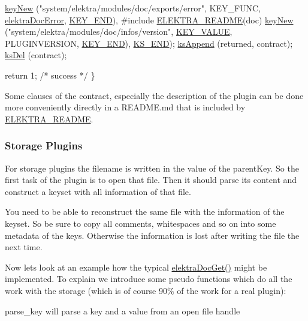 \begin{DoxyCodeInclude}
                \hyperlink{group__key_gad23c65b44bf48d773759e1f9a4d43b89}{keyNew} (\textcolor{stringliteral}{"system/elektra/modules/doc/exports/error"},
                        KEY\_FUNC, \hyperlink{group__plugin_gad74b35f558ac7c3262f6069c5c47dc79}{elektraDocError}, \hyperlink{group__key_gga91fb3178848bd682000958089abbaf40aa8adb6fcb92dec58fb19410eacfdd403}{KEY\_END}),
#include \hyperlink{group__plugin_ga78d616f68bf9fb0942f66478597467c6}{ELEKTRA\_README}(doc)
                \hyperlink{group__key_gad23c65b44bf48d773759e1f9a4d43b89}{keyNew} (\textcolor{stringliteral}{"system/elektra/modules/doc/infos/version"},
                        \hyperlink{group__key_gga91fb3178848bd682000958089abbaf40ac66e4a49d09212b79f5754ca6db5bd2e}{KEY\_VALUE}, PLUGINVERSION, \hyperlink{group__key_gga91fb3178848bd682000958089abbaf40aa8adb6fcb92dec58fb19410eacfdd403}{KEY\_END}),
                \hyperlink{kdbenum_8c_a7a28fce3773b2c873c94ac80b8b4cd54}{KS\_END});
                \hyperlink{group__keyset_ga21eb9c3a14a604ee3a8bdc779232e7b7}{ksAppend} (returned, contract);
                \hyperlink{group__keyset_ga27e5c16473b02a422238c8d970db7ac8}{ksDel} (contract);

                \textcolor{keywordflow}{return} 1; \textcolor{comment}{/* success */}
        \}
\end{DoxyCodeInclude}
 Some clauses of the contract, especially the description of the plugin can be done more conveniently directly in a R\+E\+A\+D\+M\+E.\+md that is included by \hyperlink{group__plugin_ga78d616f68bf9fb0942f66478597467c6}{E\+L\+E\+K\+T\+R\+A\+\_\+\+R\+E\+A\+D\+M\+E}.\hypertarget{group__plugin_storage}{}\subsubsection{Storage Plugins}\label{group__plugin_storage}
For storage plugins the filename is written in the value of the parent\+Key. So the first task of the plugin is to open that file. Then it should parse its content and construct a keyset with all information of that file.

You need to be able to reconstruct the same file with the information of the keyset. So be sure to copy all comments, whitespaces and so on into some metadata of the keys. Otherwise the information is lost after writing the file the next time.

Now lets look at an example how the typical \hyperlink{group__plugin_gacb69f3441c6d84241b4362f958fbe313}{elektra\+Doc\+Get()} might be implemented. To explain we introduce some pseudo functions which do all the work with the storage (which is of course 90\% of the work for a real plugin)\+:
\begin{DoxyItemize}
\item parse\+\_\+key will parse a key and a value from an open file handle
\end{DoxyItemize}

